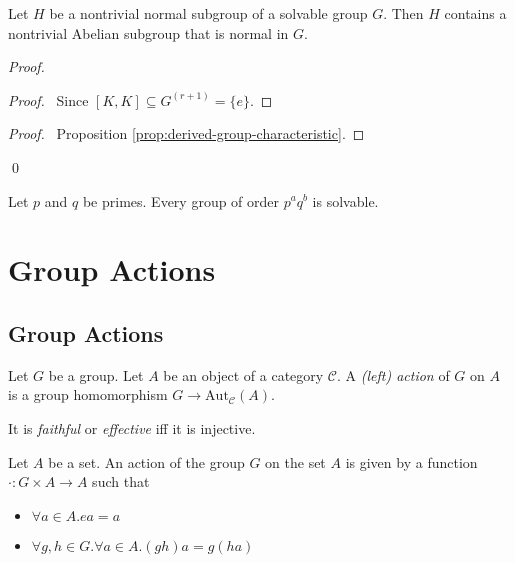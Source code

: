 \begin{prop}
Let $H$ be a nontrivial normal subgroup of a solvable group $G$. Then $H$ contains a nontrivial Abelian subgroup that is normal in $G$.
\end{prop}

\begin{proof}
\pf
{}
\begin{proof}
	\pf\ Since $[K,K] \subseteq G^{(r+1)} = \{e\}$.
\end{proof}
\begin{proof}
	\pf\ Proposition \ref{prop:derived-group-characteristic}.
\end{proof}
\qed
\end{proof}

\begin{thm}[Burnside]
Let $p$ and $q$ be primes. Every group of order $p^a q^b$ is solvable.
\end{thm}


\chapter{Group Actions}

\section{Group Actions}

\begin{df}[Action]
Let $G$ be a group. Let $A$ be an object of a category $\mathcal{C}$. A \emph{(left) action} of $G$ on $A$ is a group homomorphism $G \rightarrow \mathrm{Aut}_\mathcal{C}(A)$.

It is \emph{faithful} or \emph{effective} iff it is injective.
\end{df}

\begin{prop}
Let $A$ be a set. An action of the group $G$ on the set $A$ is given by a function $\cdot : G \times A \rightarrow A$ such that
\begin{itemize}
\item $\forall a \in A. ea = a$
\item $\forall g,h \in G. \forall a \in A. (gh)a = g(ha)$
\end{itemize}
\end{prop}

